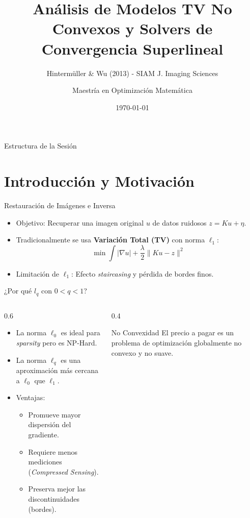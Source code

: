 \documentclass[10pt, aspectratio=169, xcolor={dvipsnames}]{beamer}
\title{Análisis de Modelos TV No Convexos y Solvers de Convergencia Superlineal}
\subtitle{Hintermüller \& Wu (2013) - SIAM J. Imaging Sciences}
\author{Maestría en Optimización Matemática}
\date{\today}
\begin{document}
\maketitle

\begin{frame}{Estructura de la Sesión}
    \tableofcontents
\end{frame}

\section{Introducción y Motivación}

\begin{frame}{Restauración de Imágenes e Inversa}
    \begin{itemize}
        \item Objetivo: Recuperar una imagen original $u$ de datos ruidosos $z = Ku + \eta$.
        \item Tradicionalmente se usa \textbf{Variación Total (TV)} con norma $\ell_1$:
        \[ \min \int |\nabla u| + \frac{\lambda}{2} \|Ku - z\|^2 \]
        \item Limitación de $\ell_1$: Efecto \textit{staircasing} y pérdida de bordes finos.
    \end{itemize}
\end{frame}

\begin{frame}{¿Por qué $l_q$ con $0 < q < 1$?}
    \begin{columns}
        \begin{column}{0.6\textwidth}
            \begin{itemize}
                \item La norma $\ell_0$ es ideal para \textit{sparsity} pero es NP-Hard.
                \item La norma $\ell_q$ es una aproximación más cercana a $\ell_0$ que $\ell_1$.
                \item Ventajas:
                \begin{itemize}
                    \item Promueve mayor dispersión del gradiente.
                    \item Requiere menos mediciones (\textit{Compressed Sensing}).
                    \item Preserva mejor las discontinuidades (bordes).
                \end{itemize}
            \end{itemize}
        \end{column}
        \begin{column}{0.4\textwidth}
            \begin{block}{No Convexidad}
                El precio a pagar es un problema de optimización globalmente no convexo y no suave.
            \end{block}
        \end{column}
    \end{columns}
\end{frame}
\end{document}
